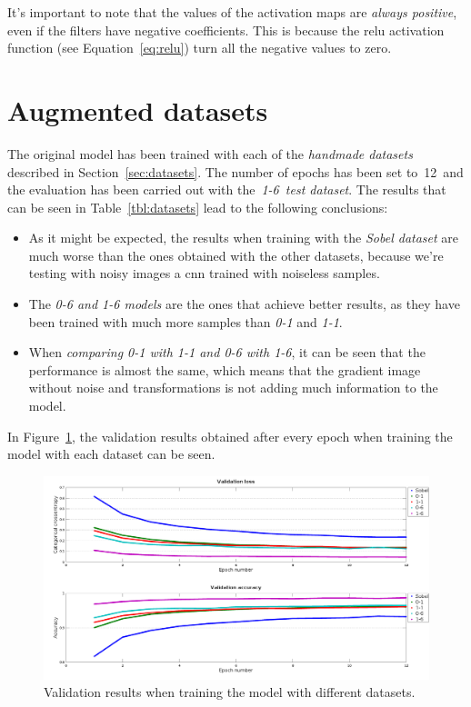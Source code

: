 It's important to note that the values of the activation maps are \emph{always positive}, even if the filters have negative coefficients. This is because the \gls{relu} activation function (see Equation~\ref{eq:relu}) turn all the negative values to zero.

\section{Augmented datasets}\label{sec:new_datasets}
The original model has been trained with each of the \emph{handmade datasets} described in Section~\ref{sec:datasets}. The number of epochs has been set to~12~and the evaluation has been carried out with the~\emph{1-6~test dataset}. The results that can be seen in Table~\ref{tbl:datasets} lead to the following conclusions:
\begin{itemize}
	\item As it might be expected, the results when training with the \emph{Sobel dataset} are much worse than the ones obtained with the other datasets, because we're testing with noisy images a \gls{cnn} trained with noiseless samples.
	\item The \emph{\textit{0-6} and \textit{1-6} models} are the ones that achieve better results, as they have been trained with much more samples than \textit{0-1} and \textit{1-1}.
	\item When \emph{comparing \textit{0-1} with \textit{1-1} and \textit{0-6} with \textit{1-6}}, it can be seen that the performance is almost the same, which means that the gradient image without noise and transformations is not adding much information to the model.
\end{itemize}
In Figure~\ref{fig:val_datasets}, the validation results obtained after every epoch when training the model with each dataset can be seen.
\begin{figure}
	\centering
	\includegraphics[width=1\linewidth, keepaspectratio]{figures/val_datasets.png}
	\caption{Validation results when training the model with different datasets.}
	\label{fig:val_datasets}
\end{figure}

